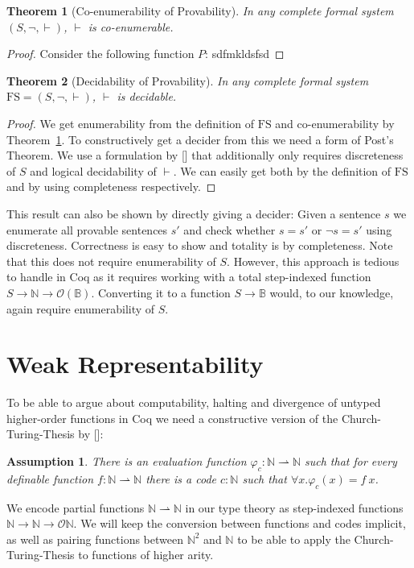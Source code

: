 \documentclass{scrartcl}
\newtheorem{assumption}{Assumption}
\newtheorem{theorem}{Theorem}
\newcommand{\FS}{\mathrm{FS}}
\newcommand{\NN}{\mathbb{N}}
\newcommand{\BB}{\mathbb{B}}
\let\oldvdash\vdash
\renewcommand{\vdash}{{\oldvdash}}
\begin{document}
\begin{theorem}[Co-enumerability of Provability] \label{thm:coenum-prov}
  In any complete formal system $(S, \neg, \vdash)$, $\vdash$ is co-enumerable.
\end{theorem}
\begin{proof}
  Consider the following function $P$:
  sdfmkldsfsd
\end{proof}
\begin{theorem}[Decidability of Provability]\label{thm:dec-prov}
  In any complete formal system $\FS = (S, \neg, \vdash)$, $\vdash$ is decidable.
\end{theorem}
\begin{proof}
  We get enumerability from the definition of $\FS$ and co-enumerability by Theorem~\ref{thm:coenum-prov}. To constructively get a decider from this we need a form of Post's Theorem. We use a formulation by [] that additionally only requires discreteness of $S$ and logical decidability of $\vdash$. We can easily get both by the definition of $\FS$ and by using completeness respectively.
\end{proof}
This result can also be shown by directly giving a decider: Given a sentence $s$ we enumerate all provable sentences $s'$ and check whether $s = s'$ or $\neg s = s'$ using discreteness. Correctness is easy to show and totality is by completeness. Note that this does not require enumerability of $S$. However, this approach is tedious to handle in Coq as it requires working with a total step-indexed function $S \to \NN \to \mathcal{O}(\BB)$. Converting it to a function $S \to \BB$ would, to our knowledge, again require enumerability of $S$.

\section{Weak Representability}
To be able to argue about computability, halting and divergence of untyped higher-order functions in Coq we need a constructive version of the Church-Turing-Thesis by []:
\begin{assumption}
  There is an evaluation function $\varphi_{c} : \NN \rightharpoonup \NN$ such that for every definable function $f : \NN \rightharpoonup \NN$ there is a code $c : \NN$ such that $\forall x. \varphi_{c}(x) = f~x$.
\end{assumption}
We encode partial functions $\NN \rightharpoonup \NN$ in our type theory as step-indexed functions $\NN \to \NN \to \mathcal{O} \NN$. We will keep the conversion between functions and codes implicit, as well as pairing functions between $\NN^{2}$ and $\NN$ to be able to apply the Church-Turing-Thesis to functions of higher arity. %
\end{document}
